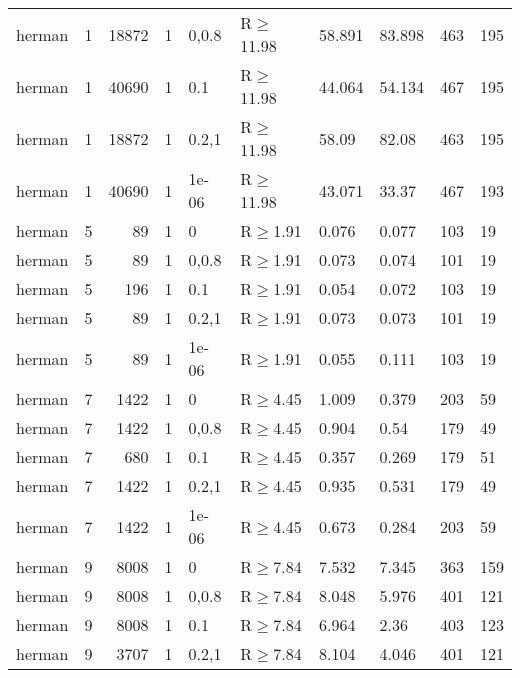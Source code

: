 \begin{longtable}{llrrllllll}
 herman        & 1        &  	18872 & 1 & 0,0.8 & R$\geq$11.98 & 58.891  & 83.898   & 463    & 195    \\
 herman        & 1        &  	40690 & 1 & 0.1   & R$\geq$11.98 & 44.064  & 54.134   & 467    & 195    \\
 herman        & 1        &  	18872 & 1 & 0.2,1 & R$\geq$11.98 & 58.09   & 82.08    & 463    & 195    \\
 herman        & 1        &  	40690 & 1 & 1e-06 & R$\geq$11.98 & 43.071  & 33.37    & 467    & 193    \\
 herman        & 5        &     	89 & 1 & 0     & R$\geq$1.91  & 0.076   & 0.077    & 103    & 19     \\
 herman        & 5        &     	89 & 1 & 0,0.8 & R$\geq$1.91  & 0.073   & 0.074    & 101    & 19     \\
 herman        & 5        &    	196 & 1 & 0.1   & R$\geq$1.91  & 0.054   & 0.072    & 103    & 19     \\
 herman        & 5        &     	89 & 1 & 0.2,1 & R$\geq$1.91  & 0.073   & 0.073    & 101    & 19     \\
 herman        & 5        &     	89 & 1 & 1e-06 & R$\geq$1.91  & 0.055   & 0.111    & 103    & 19     \\
 herman        & 7        &   	1422 & 1 & 0     & R$\geq$4.45  & 1.009   & 0.379    & 203    & 59     \\
 herman        & 7        &   	1422 & 1 & 0,0.8 & R$\geq$4.45  & 0.904   & 0.54     & 179    & 49     \\
 herman        & 7        &    	680 & 1 & 0.1   & R$\geq$4.45  & 0.357   & 0.269    & 179    & 51     \\
 herman        & 7        &   	1422 & 1 & 0.2,1 & R$\geq$4.45  & 0.935   & 0.531    & 179    & 49     \\
 herman        & 7        &   	1422 & 1 & 1e-06 & R$\geq$4.45  & 0.673   & 0.284    & 203    & 59     \\
 herman        & 9        &   	8008 & 1 & 0     & R$\geq$7.84  & 7.532   & 7.345    & 363    & 159    \\
 herman        & 9        &   	8008 & 1 & 0,0.8 & R$\geq$7.84  & 8.048   & 5.976    & 401    & 121    \\
 herman        & 9        &   	8008 & 1 & 0.1   & R$\geq$7.84  & 6.964   & 2.36     & 403    & 123    \\
 herman        & 9        &   	3707 & 1 & 0.2,1 & R$\geq$7.84  & 8.104   & 4.046    & 401    & 121    \\

\end{longtable}

